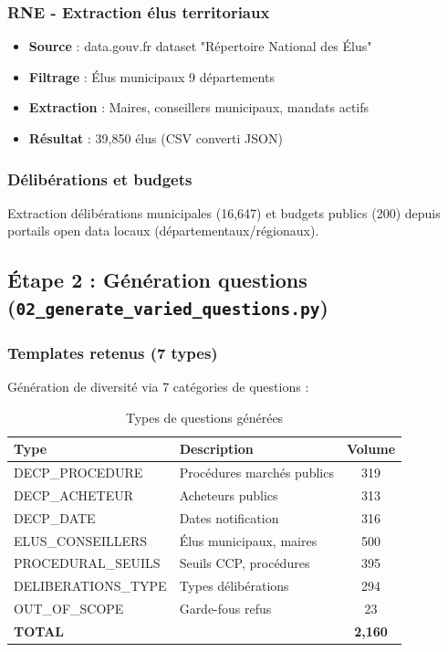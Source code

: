 \subsubsection{RNE - Extraction élus territoriaux}

\begin{itemize}
    \item \textbf{Source} : data.gouv.fr dataset "Répertoire National des Élus"
    
    \item \textbf{Filtrage} : Élus municipaux 9 départements
    
    \item \textbf{Extraction} : Maires, conseillers municipaux, mandats actifs
    
    \item \textbf{Résultat} : 39,850 élus (CSV converti JSON)
\end{itemize}

\subsubsection{Délibérations et budgets}

Extraction délibérations municipales (16,647) et budgets publics (200) depuis portails open data locaux (départementaux/régionaux).

\subsection{Étape 2 : Génération questions (\texttt{02\_generate\_varied\_questions.py})}

\subsubsection{Templates retenus (7 types)}

Génération de diversité via 7 catégories de questions :

\begin{table}[h]
\centering
\caption{Types de questions générées}
\label{tab:question_types}
\begin{tabular}{@{}llc@{}}
\toprule
\textbf{Type} & \textbf{Description} & \textbf{Volume} \\ \midrule
DECP\_PROCEDURE & Procédures marchés publics & 319 \\
DECP\_ACHETEUR & Acheteurs publics & 313 \\
DECP\_DATE & Dates notification & 316 \\
ELUS\_CONSEILLERS & Élus municipaux, maires & 500 \\
PROCEDURAL\_SEUILS & Seuils CCP, procédures & 395 \\
DELIBERATIONS\_TYPE & Types délibérations & 294 \\
OUT\_OF\_SCOPE & Garde-fous refus & 23 \\ \midrule
\textbf{TOTAL} & & \textbf{2,160} \\ \bottomrule
\end{tabular}
\end{table}

